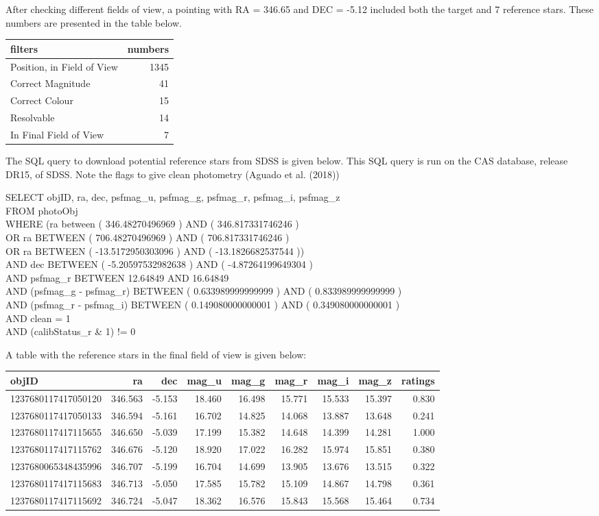 \documentclass[]{elsarticle} %
\begin{document}
After checking different fields of view, a pointing with RA = 346.65 and
DEC = -5.12 included both the target and 7 reference stars. These
numbers are presented in the table below.

\begin{longtable}[]{@{}lr@{}}
\toprule
filters & numbers\tabularnewline
\midrule
\endhead
Position, in Field of View & 1345\tabularnewline
Correct Magnitude & 41\tabularnewline
Correct Colour & 15\tabularnewline
Resolvable & 14\tabularnewline
In Final Field of View & 7\tabularnewline
\bottomrule
\end{longtable}

\newpage

The SQL query to download potential reference stars from SDSS is given
below. This SQL query is run on the CAS database, release DR15, of SDSS.
Note the flags to give clean photometry (Aguado et al. (2018))

SELECT objID, ra, dec, psfmag\_u, psfmag\_g, psfmag\_r, psfmag\_i,
psfmag\_z\\
FROM photoObj\\
WHERE (ra between ( 346.48270496969 ) AND ( 346.817331746246 )\\
OR ra BETWEEN ( 706.48270496969 ) AND ( 706.817331746246 )\\
OR ra BETWEEN ( -13.5172950303096 ) AND ( -13.1826682537544 ))\\
AND dec BETWEEN ( -5.20597532982638 ) AND ( -4.87264199649304 )\\
AND psfmag\_r BETWEEN 12.64849 AND 16.64849\\
AND (psfmag\_g - psfmag\_r) BETWEEN ( 0.633989999999999 ) AND (
0.833989999999999 )\\
AND (psfmag\_r - psfmag\_i) BETWEEN ( 0.149080000000001 ) AND (
0.349080000000001 )\\
AND clean = 1\\
AND (calibStatus\_r \& 1) != 0

A table with the reference stars in the final field of view is given
below:

\begin{longtable}[]{@{}lrrrrrrrr@{}}
\toprule
objID & ra & dec & mag\_u & mag\_g & mag\_r & mag\_i & mag\_z &
ratings\tabularnewline
\midrule
\endhead
1237680117417050120 & 346.563 & -5.153 & 18.460 & 16.498 & 15.771 &
15.533 & 15.397 & 0.830\tabularnewline
1237680117417050133 & 346.594 & -5.161 & 16.702 & 14.825 & 14.068 &
13.887 & 13.648 & 0.241\tabularnewline
1237680117417115655 & 346.650 & -5.039 & 17.199 & 15.382 & 14.648 &
14.399 & 14.281 & 1.000\tabularnewline
1237680117417115762 & 346.676 & -5.120 & 18.920 & 17.022 & 16.282 &
15.974 & 15.851 & 0.380\tabularnewline
1237680065348435996 & 346.707 & -5.199 & 16.704 & 14.699 & 13.905 &
13.676 & 13.515 & 0.322\tabularnewline
1237680117417115683 & 346.713 & -5.050 & 17.585 & 15.782 & 15.109 &
14.867 & 14.798 & 0.361\tabularnewline
1237680117417115692 & 346.724 & -5.047 & 18.362 & 16.576 & 15.843 &
15.568 & 15.464 & 0.734\tabularnewline
\bottomrule
\end{longtable}
\end{document}
